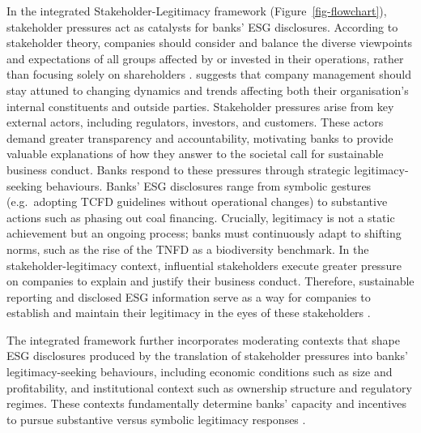 \documentclass[
  authoryear]{elsarticle}
\begin{document}
In the integrated Stakeholder-Legitimacy framework
(Figure~\ref{fig-flowchart}), stakeholder pressures act as catalysts for
banks' ESG disclosures. According to stakeholder theory, companies
should consider and balance the diverse viewpoints and expectations of
all groups affected by or invested in their operations, rather than
focusing solely on shareholders \citep{BUCHHOLZ2005, LAPLUME2008}.
\citet{FREEMAN1984} suggests that company management should stay attuned
to changing dynamics and trends affecting both their organisation's
internal constituents and outside parties. Stakeholder pressures arise
from key external actors, including regulators, investors, and
customers. These actors demand greater transparency and accountability,
motivating banks to provide valuable explanations of how they answer to
the societal call for sustainable business conduct. Banks respond to
these pressures through strategic legitimacy-seeking behaviours. Banks'
ESG disclosures range from symbolic gestures (e.g.~adopting TCFD
guidelines without operational changes) to substantive actions such as
phasing out coal financing. Crucially, legitimacy is not a static
achievement but an ongoing process; banks must continuously adapt to
shifting norms, such as the rise of the TNFD as a biodiversity
benchmark. In the stakeholder-legitimacy context, influential
stakeholders execute greater pressure on companies to explain and
justify their business conduct. Therefore, sustainable reporting and
disclosed ESG information serve as a way for companies to establish and
maintain their legitimacy in the eyes of these stakeholders
\citep{CAMPBELL_D2003}.

The integrated framework further incorporates moderating contexts that
shape ESG disclosures produced by the translation of stakeholder
pressures into banks' legitimacy-seeking behaviours, including economic
conditions such as size and profitability, and institutional context
such as ownership structure and regulatory regimes. These contexts
fundamentally determine banks' capacity and incentives to pursue
substantive versus symbolic legitimacy responses\hspace{0pt}
\citep{CAMPBELL2007, AGUINIS2012}.
\end{document}
